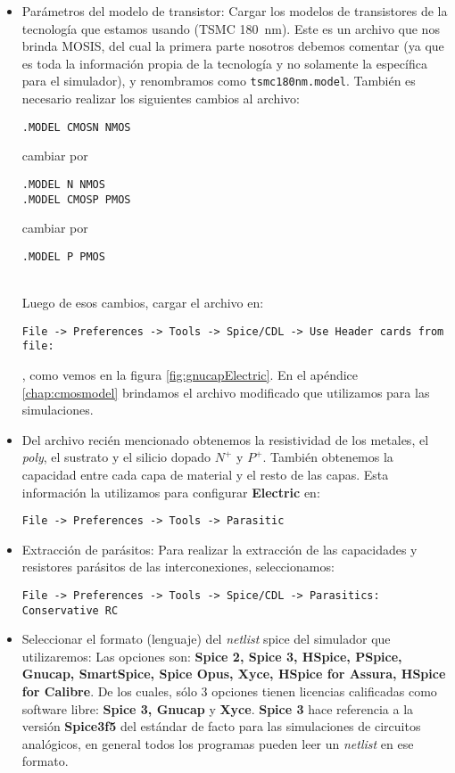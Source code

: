\begin{itemize}
\item Parámetros del modelo de transistor: Cargar los modelos de transistores de la tecnología que estamos usando (TSMC 180~nm). Este es un archivo que nos brinda MOSIS, del cual la primera parte nosotros debemos comentar (ya que es toda la información propia de la tecnología y no solamente la específica para el simulador), y renombramos como {\footnotesize\verb#tsmc180nm.model#}. También es necesario realizar los siguientes cambios al archivo:\\
\begin{footnotesize}\verb#.MODEL CMOSN NMOS#\end{footnotesize} cambiar por \begin{footnotesize}\verb#.MODEL N NMOS# \\
\verb#.MODEL CMOSP PMOS#\end{footnotesize} cambiar por \begin{footnotesize}\verb#.MODEL P PMOS# \end{footnotesize} \\
Luego de esos cambios, cargar el archivo en:\\
\begin{footnotesize}\verb.File -> Preferences -> Tools -> Spice/CDL -> Use Header cards from file:.\end{footnotesize}, como vemos en la figura \ref{fig:gnucapElectric}. En el apéndice \ref{chap:cmosmodel} brindamos el archivo modificado que utilizamos para las simulaciones.
\item Del archivo recién mencionado obtenemos la resistividad de los metales, el \emph{poly}, el sustrato y el silicio dopado $N^+$ y $P^+$. También obtenemos la capacidad entre cada capa de material y el resto de las capas. Esta información la utilizamos para configurar \textbf{Electric} en: \\
\begin{footnotesize}\verb.File -> Preferences -> Tools -> Parasitic. \end{footnotesize}
\item Extracción de parásitos: Para realizar la extracción de las capacidades y resistores parásitos de las interconexiones, seleccionamos: \\
\begin{footnotesize}\verb.File -> Preferences -> Tools -> Spice/CDL -> Parasitics: Conservative RC. \end{footnotesize}
\item Seleccionar el formato (lenguaje) del \emph{netlist} \gls{spice} del simulador que utilizaremos: Las opciones son: \textbf{Spice 2, Spice 3, HSpice, PSpice, Gnucap, SmartSpice,  Spice Opus, Xyce, HSpice for Assura, HSpice for Calibre}. De los cuales, sólo 3 opciones tienen licencias calificadas como software libre: \textbf{Spice 3, Gnucap} y \textbf{Xyce}. \textbf{Spice 3} hace referencia a la versión \textbf{Spice3f5} del estándar de facto para las simulaciones de circuitos analógicos, en general todos los programas pueden leer un \emph{netlist} en ese formato.
\end{itemize}


